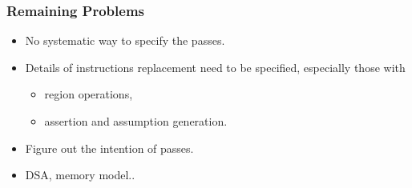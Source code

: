 \documentclass[11pt]{beamer}
\begin{document}
\begin{frame}\frametitle{Remaining Problems}

\begin{itemize}
\item No systematic way to specify the passes.
\item Details of instructions replacement need to be specified, especially those with 
\begin{itemize}
\item region operations,
\item assertion and assumption generation.
\end{itemize}
\item Figure out the intention of passes.
\item DSA, memory model..
\end{itemize}

\end{frame}


\fi
\end{document}
